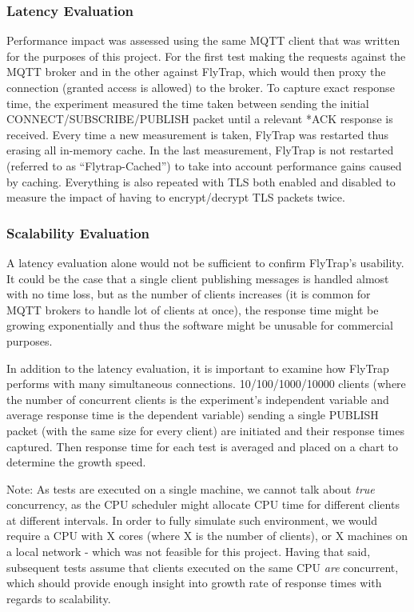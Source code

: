 \subsubsection{Latency Evaluation} Performance impact was assessed using the same MQTT client that was written for the purposes of this project. For the first test making the requests against the MQTT broker and in the other against FlyTrap, which would then proxy the connection (granted access is allowed) to the broker. To capture exact response time, the experiment measured the time taken between sending the initial CONNECT/SUBSCRIBE/PUBLISH packet until a relevant *ACK response is received. Every time a new measurement is taken, FlyTrap was restarted thus erasing all in-memory cache. In the last measurement, FlyTrap is not restarted (referred to as ``Flytrap-Cached'') to take into account performance gains caused by caching. Everything is also repeated with TLS both enabled and disabled to measure the impact of having to encrypt/decrypt TLS packets twice.
\subsubsection{Scalability Evaluation}
A latency evaluation alone would not be sufficient to confirm FlyTrap's usability. It could be the case that a single client publishing messages is handled almost with no time loss, but as the number of clients increases (it is common for MQTT brokers to handle lot of clients at once), the response time might be growing exponentially and thus the software might be unusable for commercial purposes. 

In addition to the latency evaluation, it is important to examine how FlyTrap performs with many simultaneous connections. 10/100/1000/10000 clients (where the number of concurrent clients is the experiment's independent variable and average response time is the dependent variable) sending a single PUBLISH packet (with the same size for every client) are initiated and their response times captured. Then response time for each test is averaged and placed on a chart to determine the growth speed.  

Note: As tests are executed on a single machine, we cannot talk about \textit{true} concurrency, as the CPU scheduler might allocate CPU time for different clients at different intervals. In order to fully simulate such environment, we would require a CPU with X cores (where X is the number of clients), or X machines on a local network - which was not feasible for this project. Having that said, subsequent tests assume that clients executed on the same CPU \textit{are} concurrent, which should provide enough insight into growth rate of response times with regards to scalability.
